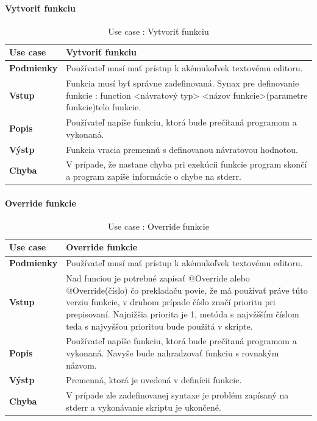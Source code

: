 \paragraph{Vytvoriť funkciu}
\begin{center}
	\begin{table}[htbp]
		\begin{tabular}{|p{2.5cm}|p{14cm}|}
			\hline
			\textbf{Use case} & Vytvoriť funkciu \\ 
			\hline
			\textbf{Podmienky} & Používateľ musí mať prístup k akémukoľvek textovému editoru.  \\ 
			\hline
			\textbf{Vstup} & Funkcia musí byť správne zadefinovaná. 
			Synax pre definovanie funkcie : 
			function <návratový typ> <názov funkcie>(parametre funkcie){telo funkcie}. \\
			\hline
			\textbf{Popis} & Používateľ napíše funkciu, ktorá bude prečítaná programom a vykonaná.\\ 
			\hline
			\textbf{Výstp} & Funkcia vracia premennú s definovanou návratovou hodnotou.\\
			\hline
			\textbf{Chyba} & V prípade, že nastane chyba pri exekúcii funkcie program skončí a program zapíše informácie o chybe na stderr.\\
			\hline
		\end{tabular}
		\label{table:1}
		\caption{Use case : Vytvoriť funkciu}
	\end{table}
\end{center}
\newpage
\paragraph{Override funkcie}
\begin{center}
	\begin{table}[htbp]
		\begin{tabular}{|p{2.5cm}|p{14cm}|}
			\hline
			\textbf{Use case} & Override funkcie \\ 
			\hline
			\textbf{Podmienky} & Používateľ musí mať prístup k akémukoľvek textovému editoru.  \\ 
			\hline
			\textbf{Vstup} & Nad funciou je potrebné zapísať @Override alebo @Override(číslo) čo prekladaču povie, že má používať práve túto verziu funkcie, v druhom prípade číslo značí prioritu pri prepisovaní. Najnižšia priorita je 1, metóda s najvžšším číslom teda s najvyššou prioritou bude použitá v skripte.\\
			\hline
			\textbf{Popis} & Používateľ napíše funkciu, ktorá bude prečítaná programom a vykonaná. Navyše bude nahradzovať funkciu s rovnakým názvom.\\ 
			\hline
			\textbf{Výstp} & Premenná, ktorá je uvedená v definícii funkcie.\\
			\hline
			\textbf{Chyba} & V prípade zle zadefinovanej syntaxe je problém zapísaný na stderr a vykonávanie skriptu je ukončené.\\
			\hline
		\end{tabular}
		\label{table:1}
		\caption{Use case : Override funkcie}
	\end{table}
\end{center}
